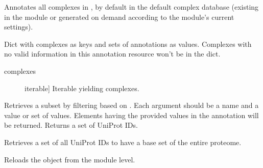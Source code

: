 \documentclass[letterpaper,10pt,english]{sphinxmanual}
\begin{document}
\begin{fulllineitems}

\begin{fulllineitems}
\label{\detokenize{reference:pypath.annot.AnnotationBase.complex_inference}}
Annotates all complexes in , by default in the default
complex database (existing in the  module or generated
on demand according to the module’s current settings).

Dict with complexes as keys and sets of annotations as values.
Complexes with no valid information in this annotation resource
won’t be in the dict.
\begin{description}
\item[{complexes}] \leavevmode{[}iterable{]}
Iterable yielding complexes.

\end{description}

\end{fulllineitems}


\begin{fulllineitems}
\label{\detokenize{reference:pypath.annot.AnnotationBase.get_subset}}
Retrieves a subset by filtering based on .
Each argument should be a name and a value or set of values.
Elements having the provided values in the annotation will be
returned.
Returns a set of UniProt IDs.

\end{fulllineitems}


\begin{fulllineitems}
\label{\detokenize{reference:pypath.annot.AnnotationBase.load_proteins}}
Retrieves a set of all UniProt IDs to have a base set of the entire
proteome.

\end{fulllineitems}


\begin{fulllineitems}
\label{\detokenize{reference:pypath.annot.AnnotationBase.reload}}
Reloads the object from the module level.

\end{fulllineitems}


\end{fulllineitems}
\end{document}
